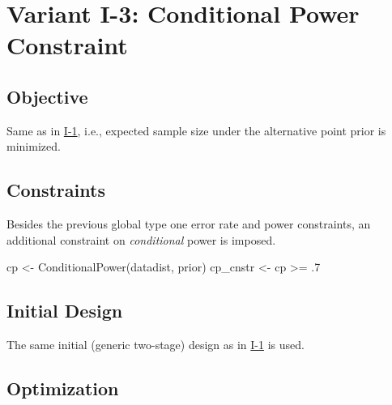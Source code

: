 \documentclass[
]{book}
\newenvironment{Shaded}{\begin{snugshade}}{\end{snugshade}}
\newcommand{\DecValTok}[1]{\textcolor[rgb]{0.00,0.00,0.81}{#1}}
\newcommand{\FunctionTok}[1]{\textcolor[rgb]{0.00,0.00,0.00}{#1}}
\newcommand{\NormalTok}[1]{#1}
\newcommand{\OtherTok}[1]{\textcolor[rgb]{0.56,0.35,0.01}{#1}}
\newcommand{\SpecialCharTok}[1]{\textcolor[rgb]{0.00,0.00,0.00}{#1}}
\begin{document}
\hypertarget{variantI_3}{%
\section{Variant I-3: Conditional Power Constraint}\label{variantI_3}}

\hypertarget{objective-2}{%
\subsection{Objective}\label{objective-2}}

Same as in \protect\hyperlink{variantI_1}{I-1}, i.e., expected sample size under the
alternative point prior is minimized.

\hypertarget{constraints-2}{%
\subsection{Constraints}\label{constraints-2}}

Besides the previous global type one error rate and power constraints,
an additional constraint on \emph{conditional} power is imposed.

\begin{Shaded}
\begin{Highlighting}[]
\NormalTok{cp       }\OtherTok{\textless{}{-}} \FunctionTok{ConditionalPower}\NormalTok{(datadist, prior)}
\NormalTok{cp\_cnstr }\OtherTok{\textless{}{-}}\NormalTok{ cp }\SpecialCharTok{\textgreater{}=}\NormalTok{ .}\DecValTok{7}
\end{Highlighting}
\end{Shaded}

\hypertarget{initial-design-1}{%
\subsection{Initial Design}\label{initial-design-1}}

The same initial (generic two-stage) design as in \protect\hyperlink{variantI_1}{I-1} is used.

\hypertarget{optimization-2}{%
\subsection{Optimization}\label{optimization-2}}
\end{document}
